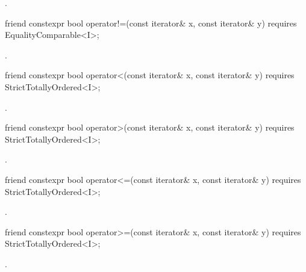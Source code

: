 \begin{itemdescr}
\pnum
\returns {}.
\end{itemdescr}

\begin{itemdecl}
friend constexpr bool operator!=(const iterator& x, const iterator& y)
requires EqualityComparable<I>;
\end{itemdecl}

\begin{itemdescr}
\pnum
\returns {}.
\end{itemdescr}

\begin{itemdecl}
friend constexpr bool operator<(const iterator& x, const iterator& y)
requires StrictTotallyOrdered<I>;
\end{itemdecl}

\begin{itemdescr}
\pnum
\returns {}.
\end{itemdescr}

\begin{itemdecl}
friend constexpr bool operator>(const iterator& x, const iterator& y)
requires StrictTotallyOrdered<I>;
\end{itemdecl}

\begin{itemdescr}
\pnum
\returns {}.
\end{itemdescr}

\begin{itemdecl}
friend constexpr bool operator<=(const iterator& x, const iterator& y)
requires StrictTotallyOrdered<I>;
\end{itemdecl}

\begin{itemdescr}
\pnum
\returns {}.
\end{itemdescr}

\begin{itemdecl}
friend constexpr bool operator>=(const iterator& x, const iterator& y)
requires StrictTotallyOrdered<I>;
\end{itemdecl}

\begin{itemdescr}
\pnum
\returns {}.
\end{itemdescr}

